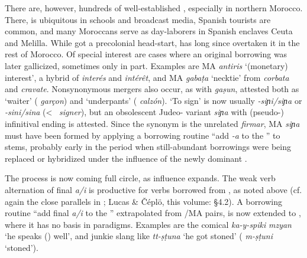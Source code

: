 \documentclass[output=paper]{langsci/langscibook}
\begin{document}
There are, however, hundreds of well-established  , especially in northern Morocco. There,  is ubiquitous in schools and broadcast media, Spanish tourists are common, and many Moroccans serve as day-laborers in Spanish enclaves Ceuta and Melilla. While  got a precolonial head-start,  has long since overtaken it in the rest of Morocco. Of special interest are cases where an original  borrowing was later gallicized, sometimes only in part. Examples are MA \textit{antiris} ‘(monetary) interest’, a hybrid of  \textit{interés} and  \textit{intérêt}, and MA \textit{g{\R}abaṭa} ‘necktie’ from  \textit{corbata} and  \textit{cravate}. Nonsynonymous mergers also occur, as with \textit{ga{\R}ṣun}, attested both as ‘waiter’ ( \textit{garçon}) and ‘underpants’ ( \textit{calzón}). ‘To sign’ is now usually \textit{\nobreakdash-siɲi/siɲa} or \textit{\nobreakdash-sini/sina} (<~ \textit{signer}), but an obsolescent Judeo- variant \textit{siɲa{\R}} with (pseudo-) infinitival ending is attested. Since the  synonym is the unrelated \textit{firmar}, MA \textit{siɲa{\R}} must have been formed by applying a borrowing routine “add \textit{-a{\R}} to the ” to  stems, probably early in the  period when still-abundant  borrowings were being replaced or hybridized under the influence of the newly dominant .

The process is now coming full circle, as  influence expands. The weak verb alternation of final \textit{a/i} is productive for verbs borrowed from , as noted above (cf. again the close parallels in ; Lucas \& Čéplö, this volume: §4.2).  A borrowing routine “add final \textit{a/i} to the ” extrapolated from /MA pairs, is now extended to , where it has no basis in   paradigms. Examples are the comical \textit{ka-y-spiki} \textit{mzyan} ‘he speaks () well’, and junkie slang like \textit{tt-ṣṭuna} ‘he got stoned’ ( \textit{m-ṣṭuni} ‘stoned’). 
\end{document}

